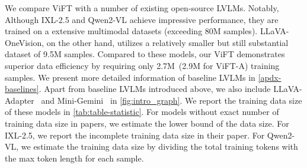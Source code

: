 We compare ViFT with a number of existing open-source LVLMs. 
Notably, Although IXL-2.5 and Qwen2-VL achieve impressive performance, they are trained on a extensive multimodal datasets (exceeding 80M samples). LLaVA-OneVision, on the other hand, utilizes a relatively smaller but still substantial dataset of 9.5M samples. Compared to these models, our ViFT demonstrates superior data efficiency by requiring only 2.7M~(2.9M for ViFT-A) training samples. We present more detailed information of baseline LVLMs in \autoref{apdx-baselines}.
Apart from baseline LVLMs introduced above, we also include LLaVA-Adapter~\cite{zhang2024llama} and Mini-Gemini~\cite{li2024mini} in \autoref{fig:intro_graph}. We report the training data size of these models in \autoref{tab:table-statistic}. For models without exact number of training data size in papers, we estimate the lower bound of the data size. For IXL-2.5, we report the incomplete training data size in their paper. For Qwen2-VL, we estimate the training data size by dividing the total training tokens with the max token length for each sample.

\begin{table}[t]
  \centering
    \caption{The statistics of training data for ViFT and other baseline LVLMs. Given that Qwen2-VL and IXL do not provide their specific training data volumes, we estimate the minimum data size based on the training data descriptions provided in their  papers.}
    \label{tab:table-statistic}
\end{table}


